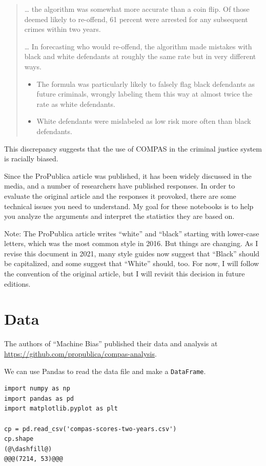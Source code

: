 \begin{quote}
\ldots{} the algorithm was somewhat more accurate than a coin flip. Of
those deemed likely to re-offend, 61 percent were arrested for any
subsequent crimes within two years.

\ldots{} In forecasting who would re-offend, the algorithm made mistakes
with black and white defendants at roughly the same rate but in very
different ways.

\begin{itemize}
\item
  The formula was particularly likely to falsely flag black defendants
  as future criminals, wrongly labeling them this way at almost twice
  the rate as white defendants.
\item
  White defendants were mislabeled as low risk more often than black
  defendants.
\end{itemize}
\end{quote}

This discrepancy suggests that the use of COMPAS in the criminal justice
system is racially biased.

Since the ProPublica article was published, it has been widely discussed
in the media, and a number of researchers have published responses. In
order to evaluate the original article and the responses it provoked,
there are some technical issues you need to understand. My goal for
these notebooks is to help you analyze the arguments and interpret the
statistics they are based on.

Note: The ProPublica article writes ``white'' and ``black'' starting
with lower-case letters, which was the most common style in 2016. But
things are changing. As I revise this document in 2021, many style
guides now suggest that ``Black'' should be capitalized, and some
suggest that ``White'' should, too. For now, I will follow the
convention of the original article, but I will revisit this decision in
future editions.

\hypertarget{data}{%
\section{Data}\label{data}}

The authors of ``Machine Bias'' published their data and analysis at
\url{https://github.com/propublica/compas-analysis}.

We can use Pandas to read the data file and make a
\passthrough{\lstinline!DataFrame!}.

\begin{lstlisting}[]
import numpy as np
import pandas as pd
import matplotlib.pyplot as plt

cp = pd.read_csv('compas-scores-two-years.csv')
cp.shape
(@\dashfill@)
@@@(7214, 53)@@@
\end{lstlisting}

